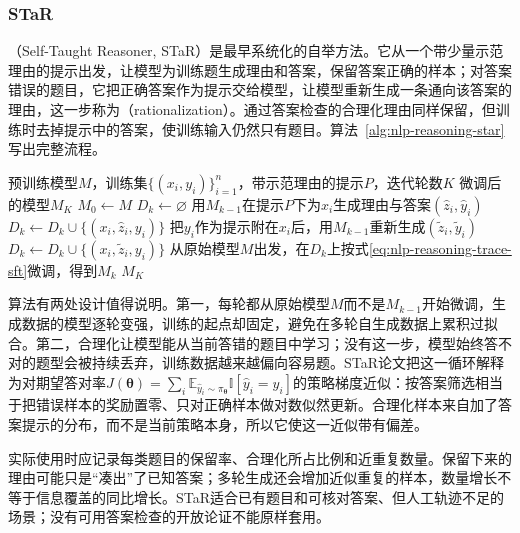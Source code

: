\subsubsection{STaR}
\label{sec:nlp-reasoning-star-algorithm}

（Self-Taught Reasoner, STaR）是最早系统化的自举方法。它从一个带少量示范理由的提示出发，让模型为训练题生成理由和答案，保留答案正确的样本；对答案错误的题目，它把正确答案作为提示交给模型，让模型重新生成一条通向该答案的理由，这一步称为（rationalization）。通过答案检查的合理化理由同样保留，但训练时去掉提示中的答案，使训练输入仍然只有题目。算法~\ref{alg:nlp-reasoning-star}写出完整流程。

\begin{algorithm}[STaR自举循环]
  \label{alg:nlp-reasoning-star}
  \begin{algorithmic}[1]
    \Require 预训练模型$M$，训练集$\{(x_i,y_i)\}_{i=1}^{n}$，带示范理由的提示$P$，迭代轮数$K$
    \Ensure 微调后的模型$M_K$
    \State $M_0\gets M$
      \State $D_k\gets\varnothing$
        \State 用$M_{k-1}$在提示$P$下为$x_i$生成理由与答案$(\hat z_i,\hat y_i)$
          \State $D_k\gets D_k\cup\{(x_i,\hat z_i,y_i)\}$
        \Else
          \State 把$y_i$作为提示附在$x_i$后，用$M_{k-1}$重新生成$(\tilde z_i,\tilde y_i)$ 
            \State $D_k\gets D_k\cup\{(x_i,\tilde z_i,y_i)\}$ 
          \EndIf
        \EndIf
      \EndFor
      \State 从原始模型$M$出发，在$D_k$上按式\eqref{eq:nlp-reasoning-trace-sft}微调，得到$M_k$
    \EndFor
    \State \Return $M_K$
  \end{algorithmic}
\end{algorithm}

算法有两处设计值得说明。第一，每轮都从原始模型$M$而不是$M_{k-1}$开始微调，生成数据的模型逐轮变强，训练的起点却固定，避免在多轮自生成数据上累积过拟合。第二，合理化让模型能从当前答错的题目中学习；没有这一步，模型始终答不对的题型会被持续丢弃，训练数据越来越偏向容易题。STaR论文把这一循环解释为对期望答对率$J(\bm\theta)=\sum_i\mathbb E_{\hat y_i\sim\pi_{\bm\theta}}\mathbb I[\hat y_i=y_i]$的策略梯度近似：按答案筛选相当于把错误样本的奖励置零、只对正确样本做对数似然更新。合理化样本来自加了答案提示的分布，而不是当前策略本身，所以它使这一近似带有偏差。

实际使用时应记录每类题目的保留率、合理化所占比例和近重复数量。保留下来的理由可能只是“凑出”了已知答案；多轮生成还会增加近似重复的样本，数量增长不等于信息覆盖的同比增长。STaR适合已有题目和可核对答案、但人工轨迹不足的场景；没有可用答案检查的开放论证不能原样套用。

